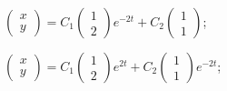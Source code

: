 \begin{enumsolsfull}
		\item \( \begin{pmatrix} x \\ y \end{pmatrix} = C_1 \begin{pmatrix} 1 \\ 2 \end{pmatrix} e^{-2t} + C_2 \begin{pmatrix} 1 \\ 1 \end{pmatrix} \); %
		\item \( \begin{pmatrix} x \\ y \end{pmatrix} = C_1 \begin{pmatrix} 1 \\ 2 \end{pmatrix} e^{2t} + C_2 \begin{pmatrix} 1 \\ 1 \end{pmatrix} e^{-2t} \); %
		

\end{enumsolsfull}
